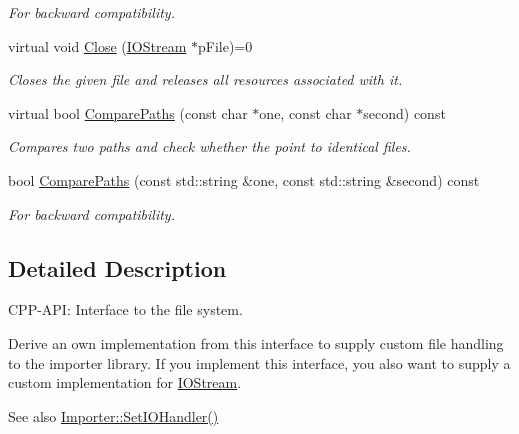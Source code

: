 \begin{DoxyCompactItemize}
\begin{DoxyCompactList}\small\item\em For backward compatibility. \end{DoxyCompactList}\item 
virtual void \hyperlink{class_assimp_1_1_i_o_system_a8c334d60f04bceeb6bd0157d21723f3e}{Close} (\hyperlink{class_assimp_1_1_i_o_stream}{I\+O\+Stream} $\ast$p\+File)=0
\begin{DoxyCompactList}\small\item\em Closes the given file and releases all resources associated with it. \end{DoxyCompactList}\item 
virtual bool \hyperlink{class_assimp_1_1_i_o_system_aeb9bb9a0c240ea39d2a06845c7616ffc}{Compare\+Paths} (const char $\ast$one, const char $\ast$second) const 
\begin{DoxyCompactList}\small\item\em Compares two paths and check whether the point to identical files. \end{DoxyCompactList}\item 
bool \hyperlink{class_assimp_1_1_i_o_system_a279d1d4b0b2aa37800e222aad508dff1}{Compare\+Paths} (const std\+::string \&one, const std\+::string \&second) const 
\begin{DoxyCompactList}\small\item\em For backward compatibility. \end{DoxyCompactList}\end{DoxyCompactItemize}


\subsection{Detailed Description}
C\+P\+P-\/\+A\+P\+I\+: Interface to the file system. 

Derive an own implementation from this interface to supply custom file handling to the importer library. If you implement this interface, you also want to supply a custom implementation for \hyperlink{class_assimp_1_1_i_o_stream}{I\+O\+Stream}.

\begin{DoxySeeAlso}{See also}
\hyperlink{class_assimp_1_1_importer_ac1c92d84d21c35dea6e5ad96a976c2ca}{Importer\+::\+Set\+I\+O\+Handler()} 
\end{DoxySeeAlso}



